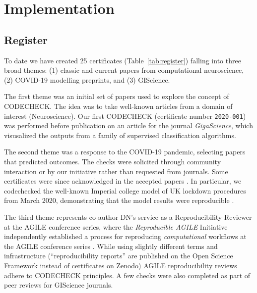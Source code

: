 \documentclass[12pt]{article}
\newcommand{\rev}[1]{\textit{#1}}
\begin{document}
\section*{Implementation}\label{implementation}

\subsection*{Register}\label{register}

To date we have created 25 certificates (Table~\ref{tab:register}) 
falling into three broad themes: (1) classic and current
papers from computational neuroscience, (2) COVID-19 modelling
preprints, and (3) GIScience.

The first theme was an initial set of papers used to explore the
concept of CODECHECK.  The idea was to take well-known articles from a
domain of interest (Neuroscience).  Our first CODECHECK (certificate
number \texttt{2020-001}) was performed before publication on an
article for the journal \emph{GigaScience}, which visusalized the
outputs from a family of supervised classification algorithms.

The second theme was a response to the COVID-19 pandemic, selecting
papers that predicted outcomes. The checks were solicited through
community interaction or by our initiative rather than requested from
journals.  Some certificates were since acknowledged in the accepted
papers \cite{Davies2020-vj,kucharski_effectiveness_2020}. In
particular, we codechecked the well-known Imperial college model of UK
lockdown procedures from March 2020,
demonstrating that the model results were reproducible
\cite{Chawla2020-hi,cert-2020-010}.

The third theme represents co-author DN's service as a Reproducibility
Reviewer at the AGILE conference series, where the \emph{Reproducible
  AGILE} Initiative \cite{reproducible_agile} independently
established a process for reproducing \rev{computational} workflows at the AGILE
conference series \cite{nust_improving_2020}.  While using slightly
different terms and infrastructure (``reproducibility reports'' are
published on the Open Science Framework instead of certificates
on Zenodo) AGILE reproducibility reviews adhere to CODECHECK
principles.  A few checks were also completed as part of peer reviews
for GIScience journals.
\end{document}
